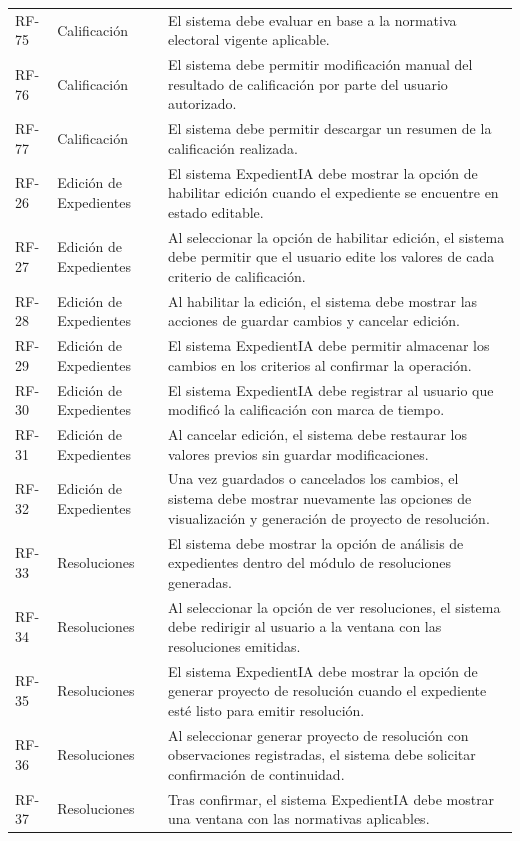 \documentclass[12pt,a4paper,oneside]{book}
\begin{document}
\begin{longtable}{@{}>{\centering\arraybackslash}p{2cm}
                    >{\centering\arraybackslash}p{3cm}
                    >{\raggedright\arraybackslash}p{10cm}@{}}
RF-75 & Calificación & El sistema debe evaluar en base a la normativa electoral vigente aplicable. \\
RF-76 & Calificación & El sistema debe permitir modificación manual del resultado de calificación por parte del usuario autorizado. \\
RF-77 & Calificación & El sistema debe permitir descargar un resumen de la calificación realizada. \\
\midrule
RF-26 & Edición de Expedientes & El sistema ExpedientIA debe mostrar la opción de habilitar edición cuando el expediente se encuentre en estado editable. \\
RF-27 & Edición de Expedientes & Al seleccionar la opción de habilitar edición, el sistema debe permitir que el usuario edite los valores de cada criterio de calificación. \\
RF-28 & Edición de Expedientes & Al habilitar la edición, el sistema debe mostrar las acciones de guardar cambios y cancelar edición. \\
RF-29 & Edición de Expedientes & El sistema ExpedientIA debe permitir almacenar los cambios en los criterios al confirmar la operación. \\
RF-30 & Edición de Expedientes & El sistema ExpedientIA debe registrar al usuario que modificó la calificación con marca de tiempo. \\
RF-31 & Edición de Expedientes & Al cancelar edición, el sistema debe restaurar los valores previos sin guardar modificaciones. \\
RF-32 & Edición de Expedientes & Una vez guardados o cancelados los cambios, el sistema debe mostrar nuevamente las opciones de visualización y generación de proyecto de resolución. \\
\midrule
RF-33 & Resoluciones & El sistema debe mostrar la opción de análisis de expedientes dentro del módulo de resoluciones generadas. \\
RF-34 & Resoluciones & Al seleccionar la opción de ver resoluciones, el sistema debe redirigir al usuario a la ventana con las resoluciones emitidas. \\
RF-35 & Resoluciones & El sistema ExpedientIA debe mostrar la opción de generar proyecto de resolución cuando el expediente esté listo para emitir resolución. \\
RF-36 & Resoluciones & Al seleccionar generar proyecto de resolución con observaciones registradas, el sistema debe solicitar confirmación de continuidad. \\
RF-37 & Resoluciones & Tras confirmar, el sistema ExpedientIA debe mostrar una ventana con las normativas aplicables. \\

\end{longtable}
\end{document}
